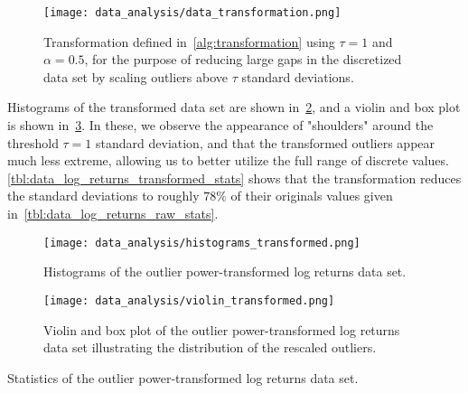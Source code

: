\begin{figure}[!htb]
    \begin{center}
        \texttt{[image: data\_analysis/data\_transformation.png]}
    \end{center}
    \caption{Transformation defined in~\cref{alg:transformation} using \( \tau = 1 \) and \( \alpha = 0.5 \), for the purpose of reducing large gaps in the discretized data set by scaling outliers above \( \tau \) standard deviations.}
    \label{fig:data_transformation}
\end{figure}

Histograms of the transformed data set are shown in~\cref{fig:histograms_transformed}, and a violin and box plot is shown in~\cref{fig:violin_transformed}.
In these, we observe the appearance of "shoulders" around the threshold \( \tau = 1 \) standard deviation, and that the transformed outliers appear much less extreme, allowing us to better utilize the full range of discrete values.
\cref{tbl:data_log_returns_transformed_stats} shows that the transformation reduces the standard deviations to roughly \( 78\% \) of their originals values given in~\cref{tbl:data_log_returns_raw_stats}.

\begin{figure}[!htb]
    \begin{center}
        \texttt{[image: data\_analysis/histograms\_transformed.png]}
    \end{center}
    \caption{Histograms of the outlier power-transformed log returns data set.}
    \label{fig:histograms_transformed}
\end{figure}
\begin{figure}[!htb]
    \begin{center}
        \texttt{[image: data\_analysis/violin\_transformed.png]}
    \end{center}
    \caption{Violin and box plot of the outlier power-transformed log returns data set illustrating the distribution of the rescaled outliers.}
    \label{fig:violin_transformed}
\end{figure}
\begin{table}[!htb]
    \centering
    \begin{adjustbox}{max width=\textwidth}
        
    \end{adjustbox}
    \caption{Statistics of the outlier power-transformed log returns data set.}
    \label{tbl:data_log_returns_transformed_stats}
\end{table}

